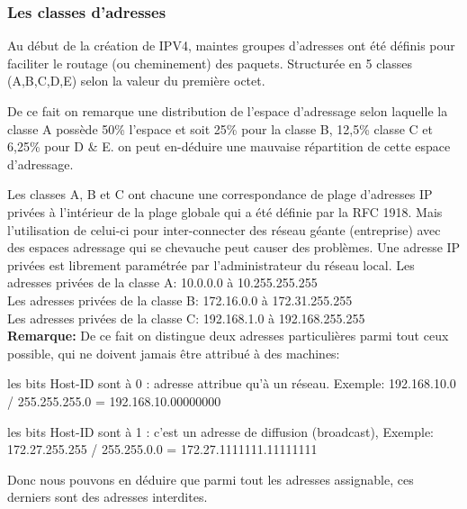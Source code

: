 \subsubsection{Les classes d’adresses}
Au début de la création de IPV4, maintes groupes d’adresses ont été définis
pour faciliter le routage (ou cheminement) des paquets. Structurée en 5 classes
(A,B,C,D,E) selon la valeur du première octet.


De ce fait on remarque une distribution de l’espace d’adressage selon laquelle
la classe A possède 50\% l’espace et soit 25\% pour la classe B, 12,5\% classe
C et 6,25\% pour D \& E. on peut en-déduire une mauvaise répartition de cette
espace d’adressage. 

Les classes A, B et C ont chacune une correspondance de plage
d’adresses IP privées à l’intérieur de la plage globale qui a été définie par
la RFC 1918. Mais l’utilisation  de celui-ci pour inter-connecter des réseau
géante (entreprise) avec des espaces adressage qui se chevauche peut causer des
problèmes. Une adresse IP privées est librement paramétrée par l’administrateur
du réseau local.
Les adresses privées de la classe A: 10.0.0.0 à 10.255.255.255\\
Les adresses privées de la classe B: 172.16.0.0 à 172.31.255.255\\
Les adresses privées de la classe C: 192.168.1.0 à 192.168.255.255\\


\textbf{Remarque:}
De ce fait on distingue deux adresses particulières parmi tout ceux possible,
qui ne doivent jamais être attribué à des machines:

     les bits Host-ID sont à 0 : adresse attribue qu’à un réseau.
Exemple: 192.168.10.0 / 255.255.255.0 = 192.168.10.00000000

    les bits Host-ID sont à 1 : c’est un adresse de  diffusion (broadcast),
Exemple: 172.27.255.255 / 255.255.0.0 = 172.27.1111111.11111111

Donc nous pouvons en déduire que parmi tout les adresses assignable, ces
derniers sont des adresses interdites.

